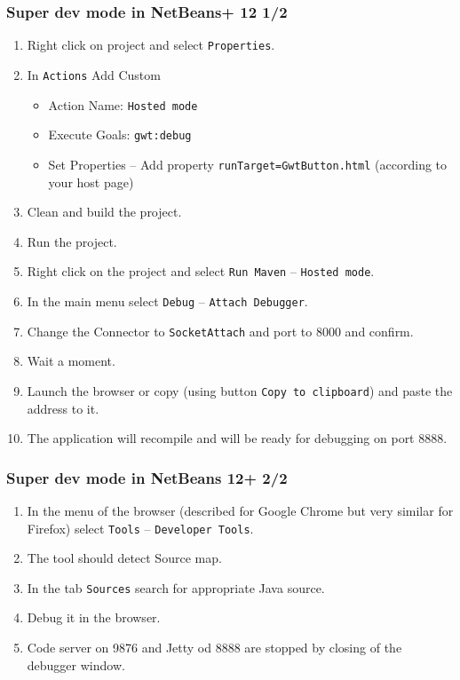 \documentclass[10pt,table, xcolor=pdflatex]{beamer}
\begin{document}
\begin{frame}\frametitle{Super dev mode in NetBeans+ 12 1/2}
  \begin{enumerate}
    \item Right click on project and select \texttt{Properties}.
    \item In \texttt{Actions} Add Custom
      \begin{itemize}
        \item Action Name: \texttt{Hosted mode}
        \item Execute Goals: \texttt{gwt:debug}
        \item Set Properties -- Add property \texttt{runTarget=GwtButton.html} (according to your host page)
      \end{itemize}
    \item Clean and build the project.
    \item Run the project.
    \item Right click on the project and select \texttt{Run Maven} -- \texttt{Hosted mode}.
    \item In the main menu select \texttt{Debug} -- \texttt{Attach Debugger}.
    \item Change the Connector to \texttt{SocketAttach} and port to 8000 and confirm.
    \item Wait a moment.
    \item Launch the browser or copy (using button \texttt{Copy to clipboard}) and paste the address to it.
    \item The application will recompile and will be ready for debugging on port 8888.
  \end{enumerate}
\end{frame}


\begin{frame}\frametitle{Super dev mode in NetBeans 12+ 2/2}
  \begin{enumerate}
    \item In the menu of the browser (described for Google Chrome but very similar for Firefox) select \texttt{Tools} -- \texttt{Developer Tools}.
    \item The tool should detect Source map.
    \item In the tab \texttt{Sources} search for appropriate Java source.
    \item Debug it in the browser.
    \item Code server on 9876 and Jetty od 8888 are stopped by closing of the debugger window.
  \end{enumerate}
\end{frame}
\end{document}
